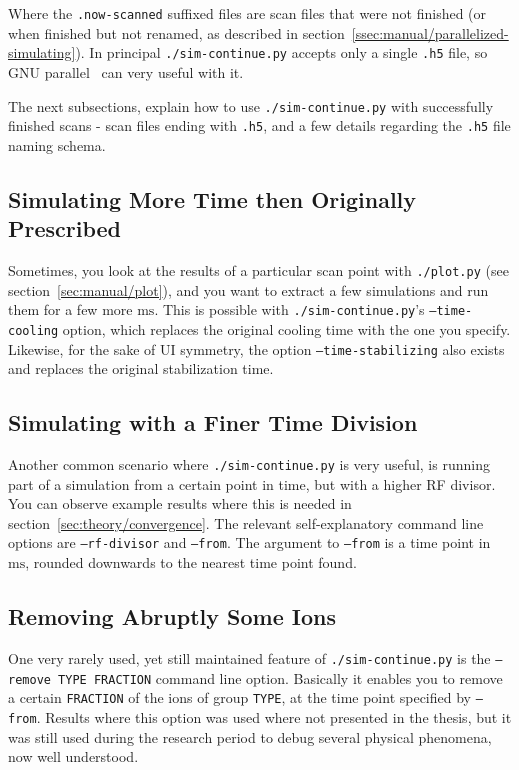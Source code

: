 Where the \texttt{.now-scanned} suffixed files are scan files that were not finished (or when finished but not renamed, as described in section~\ref{ssec:manual/parallelized-simulating}). In principal \texttt{./sim-continue.py} accepts only a single \texttt{.h5} file, so GNU parallel~\cite{GNUParallel} can very useful with it.

The next subsections, explain how to use \texttt{./sim-continue.py} with successfully finished scans - scan files ending with \texttt{.h5}, and a few details regarding the \texttt{.h5} file naming schema.

\subsection{Simulating More Time then Originally Prescribed}

Sometimes, you look at the results of a particular scan point with \texttt{./plot.py} (see section~\ref{sec:manual/plot}), and you want to extract a few simulations and run them for a few more $\mathrm{ms}$. This is possible with \texttt{./sim-continue.py}'s \texttt{--time-cooling} option, which replaces the original cooling time with the one you specify. Likewise, for the sake of UI symmetry, the option \texttt{--time-stabilizing} also exists and replaces the original stabilization time.

\subsection{Simulating with a Finer Time Division}

Another common scenario where \texttt{./sim-continue.py} is very useful, is running part of a simulation from a certain point in time, but with a higher RF divisor. You can observe example results where this is needed in section~\ref{sec:theory/convergence}. The relevant self-explanatory command line options are \texttt{--rf-divisor} and \texttt{--from}. The argument to \texttt{--from} is a time point in $\mathrm{ms}$, rounded downwards to the nearest time point found.

\subsection{Removing Abruptly Some Ions}

One very rarely used, yet still maintained feature of \texttt{./sim-continue.py} is the \texttt{--remove TYPE FRACTION} command line option. Basically it enables you to remove a certain \texttt{FRACTION} of the ions of group \texttt{TYPE}, at the time point specified by \texttt{--from}. Results where this option was used where not presented in the thesis, but it was still used during the research period to debug several physical phenomena, now well understood.

